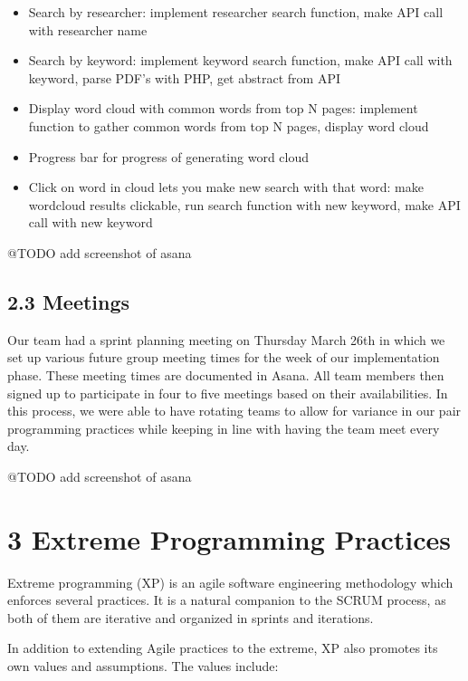 \documentclass[]{article}
\begin{document}
\begin{itemize}
  \begin{itemize}
  \itemsep1pt\parskip0pt
  \item
    Search by researcher: implement researcher search function, make API
    call with researcher name
  \item
    Search by keyword: implement keyword search function, make API call
    with keyword, parse PDF's with PHP, get abstract from API
  \item
    Display word cloud with common words from top N pages: implement
    function to gather common words from top N pages, display word cloud
  \item
    Progress bar for progress of generating word cloud
  \item
    Click on word in cloud lets you make new search with that word: make
    wordcloud results clickable, run search function with new keyword,
    make API call with new keyword
  \end{itemize}
\end{itemize}

@TODO add screenshot of asana

\subsection{2.3 Meetings}\label{meetings}

Our team had a sprint planning meeting on Thursday March 26th in which
we set up various future group meeting times for the week of our
implementation phase. These meeting times are documented in Asana. All
team members then signed up to participate in four to five meetings
based on their availabilities. In this process, we were able to have
rotating teams to allow for variance in our pair programming practices
while keeping in line with having the team meet every day.

@TODO add screenshot of asana

\section{3 Extreme Programming
Practices}\label{extreme-programming-practices}

Extreme programming (XP) is an agile software engineering methodology
which enforces several practices. It is a natural companion to the SCRUM
process, as both of them are iterative and organized in sprints and
iterations.

In addition to extending Agile practices to the extreme, XP also
promotes its own values and assumptions. The values include:
\end{document}
